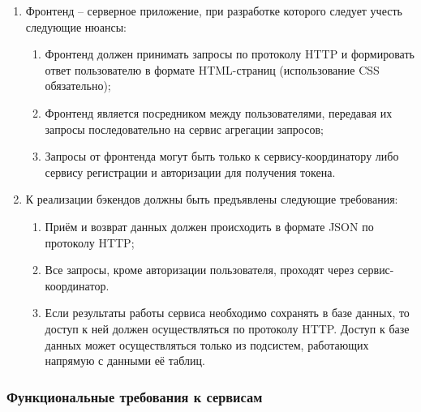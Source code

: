 \documentclass{bmstu-gost-7-32}
\begin{document}
\begin{enumerate}
	\item Фронтенд – серверное приложение, при разработке которого
	следует учесть следующие нюансы:
	\begin{enumerate}
		\item Фронтенд должен принимать запросы по протоколу HTTP и формировать ответ пользователю в формате HTML-страниц (использование CSS обязательно);
		\item Фронтенд является посредником между пользователями, передавая их запросы последовательно на сервис агрегации запросов;
		\item Запросы от фронтенда могут быть только к сервису-координатору либо сервису регистрации и авторизации для получения токена.
	\end{enumerate}
	\item К реализации бэкендов должны быть предъявлены следующие
	требования:
	\begin{enumerate}
		\item Приём и возврат данных должен происходить в формате JSON по протоколу HTTP;
		\item Все запросы, кроме авторизации пользователя, проходят через сервис-координатор.
		\item Если результаты работы сервиса необходимо сохранять в базе данных, то доступ к ней должен осуществляться по протоколу HTTP.
		Доступ к базе данных может осуществляться только из
		подсистем, работающих напрямую с данными её таблиц.
	\end{enumerate}
\end{enumerate}

\subsubsection{Функциональные требования к сервисам}
\end{document}
